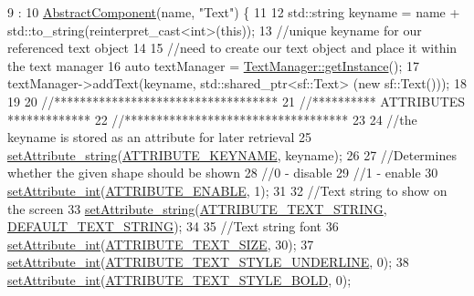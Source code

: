 \begin{DoxyCode}
9                                            : 
10     \hyperlink{class_abstract_component_ab08b845eddbdbe411b95a5385501ab97}{AbstractComponent}(name, \textcolor{stringliteral}{"Text"}) \{
11 
12     std::string keyname = name + std::to\_string(reinterpret\_cast<int>(\textcolor{keyword}{this}));
13     \textcolor{comment}{//unique keyname for our referenced text object}
14 
15     \textcolor{comment}{//need to create our text object and place it within the text manager}
16     \textcolor{keyword}{auto} textManager = \hyperlink{class_text_manager_abf9e79079b6ccf917b3cd3a100c7e7bb}{TextManager::getInstance}();
17     textManager->addText(keyname, std::shared\_ptr<sf::Text> (\textcolor{keyword}{new} sf::Text()));
18 
19 
20     \textcolor{comment}{//***********************************}
21     \textcolor{comment}{//********** ATTRIBUTES *************}
22     \textcolor{comment}{//***********************************}
23     
24     \textcolor{comment}{//the keyname is stored as an attribute for later retrieval}
25     \hyperlink{class_abstract_component_a702ec2cc2624561ef51afcd9c8061fd2}{setAttribute\_string}(\hyperlink{_a_e___attributes_8h_a38d48cad306c55d90faa362aa5023de8}{ATTRIBUTE\_KEYNAME}, keyname);
26 
27     \textcolor{comment}{//Determines whether the given shape should be shown}
28         \textcolor{comment}{//0 - disable}
29         \textcolor{comment}{//1 - enable}
30     \hyperlink{class_abstract_component_aca84c14d196467bda6aff90521b1ae7f}{setAttribute\_int}(\hyperlink{_a_e___attributes_8h_a4c775095baf8a9c99621ad9ad3b622db}{ATTRIBUTE\_ENABLE}, 1);
31 
32     \textcolor{comment}{//Text string to show on the screen}
33     \hyperlink{class_abstract_component_a702ec2cc2624561ef51afcd9c8061fd2}{setAttribute\_string}(\hyperlink{_a_e___attributes_8h_a4d13d9bfe85868610a12fb7b392ff417}{ATTRIBUTE\_TEXT\_STRING}, 
      \hyperlink{_a_e___attributes_8h_a64d322f8d0170e703ae53c4a39131ee0}{DEFAULT\_TEXT\_STRING});
34 
35     \textcolor{comment}{//Text string font}
36     \hyperlink{class_abstract_component_aca84c14d196467bda6aff90521b1ae7f}{setAttribute\_int}(\hyperlink{_a_e___attributes_8h_a70c9ec177cd9577d55d0a6a80d1f42df}{ATTRIBUTE\_TEXT\_SIZE}, 30);
37     \hyperlink{class_abstract_component_aca84c14d196467bda6aff90521b1ae7f}{setAttribute\_int}(\hyperlink{_a_e___attributes_8h_a918ec55de79782adea7bdd8c15f4e4ea}{ATTRIBUTE\_TEXT\_STYLE\_UNDERLINE}, 0);
38     \hyperlink{class_abstract_component_aca84c14d196467bda6aff90521b1ae7f}{setAttribute\_int}(\hyperlink{_a_e___attributes_8h_a1d58f347df93f4aa7a658a90b6762917}{ATTRIBUTE\_TEXT\_STYLE\_BOLD}, 0);

\end{DoxyCode}

